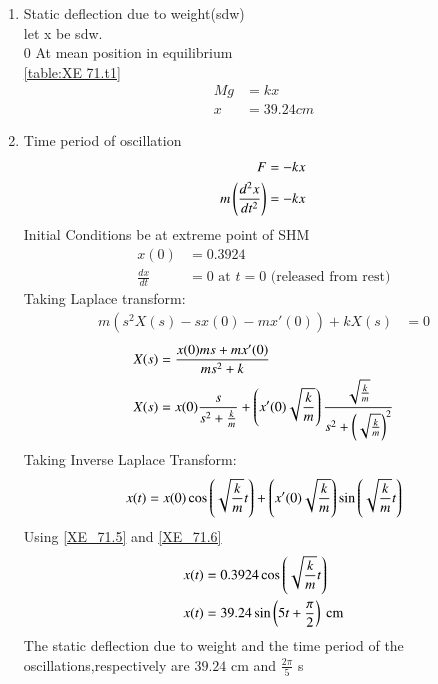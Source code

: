 \documentclass[journal,12pt,twocolumn]{IEEEtran}
\theoremstyle{remark}
\begin{document}
\begin{enumerate}
    \item Static deflection due to weight(sdw)\\
    let x be sdw.\\0
    At mean position in equilibrium\\
    \ref{table:XE 71.t1}
    \begin{align}
        Mg&=kx\\
        x&=39.24cm
    \end{align}
     \item Time period of oscillation\\
     \begin{align}
           F&=-kx\\
           m\left(\frac{d^2x}{dt^2}\right)&=-kx
     \end{align}
      Initial Conditions be at extreme  point of SHM
      \begin{align}
       x(0)&=0.3924 \label{XE_71.5}\\
       \frac{dx}{dt}&=0 \text{ at } t=0 \text{ (released from rest)} \label{XE_71.6}
        \end{align} 
     Taking Laplace transform:
     \begin{align}
     m(s^2X(s)-sx(0)-mx'(0))+kX(s)&=0
     \end{align}
     \begin{align}
      X(s) &= \frac{x(0)ms+mx'(0)}{ms^2 + k}\\
      X(s)&=x(0)\frac{s}{s^2+\frac{k}{m}}+\left(x'(0)\sqrt{\frac{k}{m}}\right)\frac{\sqrt{\frac{k}{m}}}{s^2+\left(\sqrt{\frac{k}{m}}\right)^2}
      \end{align}
     Taking Inverse Laplace Transform:\\
     \begin{align}
     x(t)&=x(0)\cos\left(\sqrt{\frac{k}{m}}t\right)+\left(x'(0)\sqrt{\frac{k}{m}}\right)\sin \left(\sqrt{\frac{k}{m}}t\right)\\
     \end{align}
     Using \ref{XE_71.5} and \ref{XE_71.6} 
     \begin{align}
      x(t) &= 0.3924 \cos\left(\sqrt{\frac{k}{m}}t\right)\\
      x(t)&=39.24 \sin\left(5t+\frac{\pi}{2}\right) \text{ cm}
     \end{align}
    The static deflection due to weight and the time period of the oscillations,respectively are $39.24$ cm and $\frac{2\pi}{5}$ s
\end{enumerate}
\end{document}
